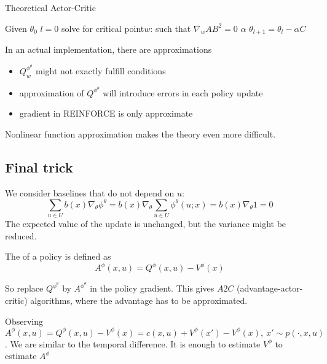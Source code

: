 \begin{algorithm}[H]
    \caption{Theoretical Actor-Critic}\label{alg:tac}
    \begin{algorithmic}
    \State Given \(\theta_0\)
    \State $l=0$
        \State solve for critical point\(w\): such that \(\nabla_w AB^2=0\)
        \State \(\alpha\)
        \State \(\theta_{l+1}=\theta_l-\alpha C\)
    \EndWhile
\end{algorithmic}
\end{algorithm}

In an actual implementation, there are approximations 
\begin{itemize}
    \item \(Q_w^{\phi^\theta}\) might not exactly fulfill conditions 
    \item approximation of \(Q^{\phi^\theta}\) will introduce errors in each policy update 
    \item gradient in REINFORCE is only approximate
\end{itemize}

Nonlinear function approximation makes the theory even more difficult.

\subsection{Final trick}
We consider baselines that do not depend on \(u:\)
\[\sum_{u\in U}b(x)\nabla_\theta\phi^\theta=b(x)\nabla_\theta\sum_{u\in U}\phi^\theta(u;x)=b(x)\nabla_\theta 1=0\] 
The expected value of the update is unchanged, but the variance might be reduced.

\begin{definition}\label{def:64}
    The  of a policy is defined as 
    \[A^\phi(x,u)=Q^\phi(x,u)-V^\phi(x)\]
\end{definition}

So replace  \(Q^{\phi^\theta}\) by \(A^{\phi^\theta}\) in the policy gradient.
This gives \(A2C\) (advantage-actor-critic) algorithms, where 
the advantage has to be approximated.

Observing \(A^{\phi}(x,u)=Q^\phi(x,u)-V^\phi(x)=c(x,u)+V^\phi(x')-V^\phi(x),\ x'\sim p(\cdot,x,u)\).
We are similar to the temporal difference. It is enough to estimate \(V^\phi\) to estimate \(A^\phi\)




















